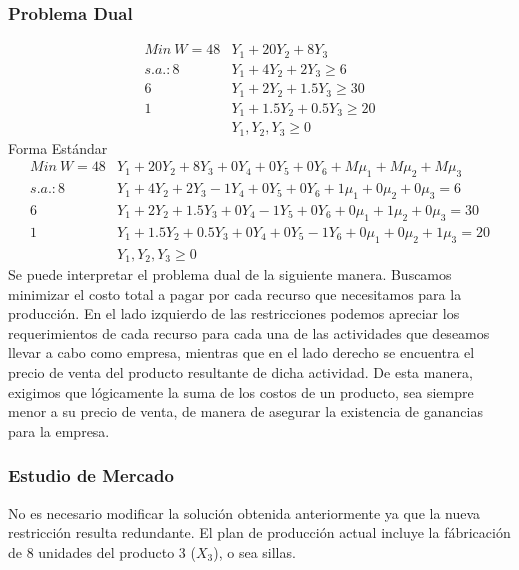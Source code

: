 \begin{homeworkProblem}[1][Dakota]
\subsubsection{Problema Dual}
\begin{align*}
  Min\ W = 48&Y_1 + 20Y_2 + 8Y_3 \\
  s.a.: 8&Y_1 + 4Y_2 + 2Y_3 \ge 6 \\
        6&Y_1 + 2Y_2 + 1.5Y_3 \ge 30 \\
        1&Y_1 + 1.5Y_2 + 0.5Y_3 \ge 20 \\ 
        &Y_1,Y_2,Y_3 \ge 0
\end{align*}
Forma Estándar
\begin{align*}
  Min\ W = 48&Y_1 + 20Y_2 + 8Y_3 + 0Y_4 + 0Y_5 + 0Y_6 + M\mu_1 + M\mu_2 + M\mu_3 \\
  s.a.: 8&Y_1 + 4Y_2 + 2Y_3 - 1Y_4 + 0Y_5 + 0Y_6 + 1\mu_1 + 0\mu_2 + 0\mu_3 = 6\\
        6&Y_1 + 2Y_2 + 1.5Y_3 + 0Y_4 - 1Y_5 + 0Y_6 + 0\mu_1 + 1\mu_2 + 0\mu_3 = 30 \\
        1&Y_1 + 1.5Y_2 + 0.5Y_3 +0Y_4 + 0Y_5 - 1Y_6 + 0\mu_1 + 0\mu_2 + 1\mu_3 = 20   \\ 
        &Y_1,Y_2,Y_3 \ge 0
\end{align*}
Se puede interpretar el problema dual de la siguiente manera. Buscamos minimizar el costo total a pagar por cada recurso que necesitamos para la producción.
En el lado izquierdo de las restricciones podemos apreciar los requerimientos de cada recurso para cada una de las actividades que deseamos llevar a cabo como empresa, mientras
que en el lado derecho se encuentra el precio de venta del producto resultante de dicha actividad. De esta manera, exigimos que lógicamente la suma de los costos de un producto, sea siempre menor a su precio de venta, de manera de asegurar la existencia de ganancias para la empresa.


\subsubsection{Estudio de Mercado}
No es necesario modificar la solución obtenida anteriormente ya que la nueva restricción resulta redundante.
El plan de producción actual incluye la fábricación de 8 unidades del producto 3 ($X_3$), o sea sillas.


\end{homeworkProblem}
